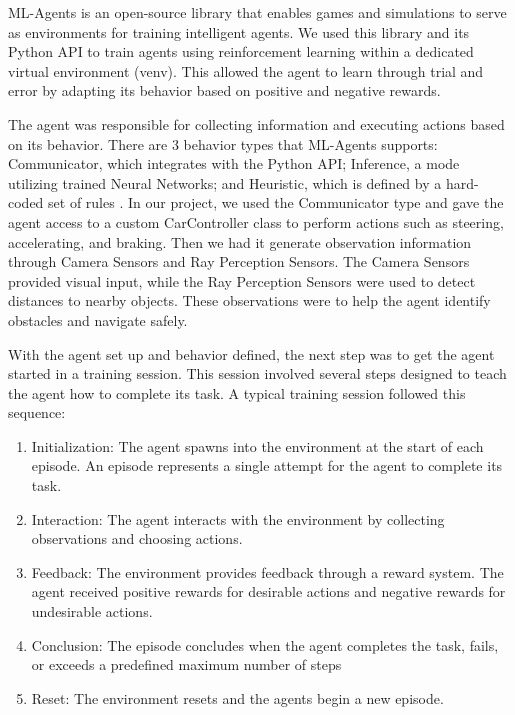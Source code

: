 ML-Agents is an open-source library that enables games and simulations to serve as environments for training intelligent agents. We used this library and its Python API to train agents using reinforcement learning within a dedicated virtual environment (venv). This allowed the agent to learn through trial and error by adapting its behavior based on positive and negative rewards.

The agent was responsible for collecting information and executing actions based on its behavior. There are 3 behavior types that ML-Agents supports: Communicator, which integrates with the Python API; Inference, a mode utilizing trained Neural Networks; and Heuristic, which is defined by a hard-coded set of rules \cite{mlAgentsOverview2024}. In our project, we used the Communicator type and gave the agent access to a custom CarController class to perform actions such as steering, accelerating, and braking. Then we had it generate observation information through Camera Sensors and Ray Perception Sensors. The Camera Sensors provided visual input, while the Ray Perception Sensors were used to detect distances to nearby objects. These observations were to help the agent identify obstacles and navigate safely.

With the agent set up and behavior defined, the next step was to get the agent started in a training session. This session involved several steps designed to teach the agent how to complete its task. A typical training session followed this sequence:
\begin{enumerate}
    \item Initialization: The agent spawns into the environment at the start of each episode. An episode represents a single attempt for the agent to complete its task.
    \item Interaction: The agent interacts with the environment by collecting observations and choosing actions.
    \item Feedback: The environment provides feedback through a reward system. The agent received positive rewards for desirable actions and negative rewards for undesirable actions.
    \item Conclusion: The episode concludes when the agent completes the task, fails, or exceeds a predefined maximum number of steps
    \item Reset: The environment resets and the agents begin a new episode.
\end{enumerate}
